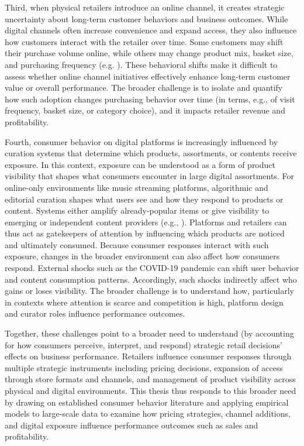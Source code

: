 Third, when physical retailers introduce an online channel, it creates strategic uncertainty about long-term customer behaviors and business outcomes. While digital channels often increase convenience and expand access, they also influence how customers interact with the retailer over time. Some customers may shift their purchase volume online, while others may change product mix, basket size, and purchasing frequency (e.g. \cite{Ansari2008-qz,Li2015-tq,Melis2016-mf}). These behavioral shifts make it difficult to assess whether online channel initiatives effectively enhance long-term customer value or overall performance. The broader challenge is to isolate and quantify how such adoption changes purchasing behavior over time (in terms, e.g., of visit frequency, basket size, or category choice), and it impacts retailer revenue and profitability.

Fourth, consumer behavior on digital platforms is increasingly influenced by curation systems that determine which products, assortments, or contents receive exposure. In this context, exposure can be understood as a form of product visibility that shapes what consumers encounter in large digital assortments. For online-only environments like music streaming platforms, algorithmic and editorial curation shapes what users see and how they respond to products or content. Systems either amplify already-popular items or give visibility to emerging or independent content providers (e.g., \cite{Brynjolfsson2010-ya}). Platforms and retailers can thus act as gatekeepers of attention by influencing which products are noticed and ultimately consumed. Because consumer responses interact with such exposure, changes in the broader environment can also affect how consumers respond. External shocks such as the COVID-19 pandemic can shift user behavior and content consumption patterns. Accordingly, such shocks indirectly affect who gains or loses visibility. The broader challenge is to understand how, particularly in contexts where attention is scarce and competition is high, platform design and curator roles influence performance outcomes.

Together, these challenges point to a broader need to understand (by accounting for how consumers perceive, interpret, and respond) strategic retail decisions’ effects on business performance. Retailers influence consumer responses through multiple strategic instruments including pricing decisions, expansion of access through store formats and channels, and management of product visibility across physical and digital environments. This thesis thus responds to this broader need by drawing on established consumer behavior literature and applying empirical models to large-scale data to examine how pricing strategies, channel additions, and digital exposure influence performance outcomes such as sales and profitability. 

